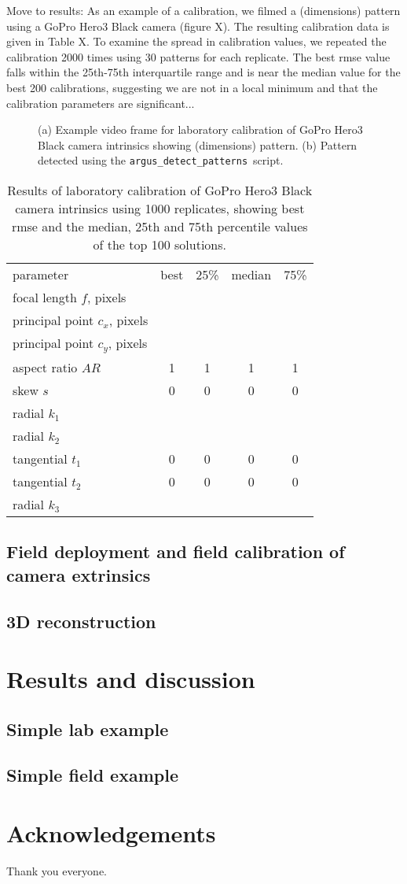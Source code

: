 \documentclass[fleqn,10pt]{wlpeerj}
\newcommand{\detectpatterns}{\texttt{argus\_detect\_patterns}}
\begin{document}
Move to results: As an example of a calibration, we filmed a (dimensions) pattern using a GoPro Hero3 Black camera (figure X).  The resulting calibration data is given in Table X. To examine the spread in calibration values, we repeated the calibration 2000 times using 30 patterns for each replicate. The best rmse value falls within the 25th-75th interquartile range and is near the median value for the best 200 calibrations, suggesting we are not in a local minimum and that the calibration parameters are significant...   

\begin{figure}
\caption{(a) Example video frame for laboratory calibration of GoPro Hero3 Black camera intrinsics showing (dimensions) pattern.  (b) Pattern detected using the \detectpatterns\ script.}
\label{fig:labcal1}
\end{figure}

\begin{table}
\caption{Results of laboratory calibration of GoPro Hero3 Black camera intrinsics using 1000 replicates, showing best rmse and the median, 25th and 75th percentile values of the top 100 solutions. }
\label{tab:labcal2}
\begin{center}
\begin{tabular}{lcccc}
parameter & best & 25\% & median & 75\% \\
\cline{1-5}
focal length $f$, pixels & & & &\\
principal point $c_x$, pixels & & & & \\
principal point $c_y$, pixels & & & & \\
aspect ratio $AR$ & 1 & 1 & 1 & 1\\
skew $s$ & 0 & 0 & 0 & 0 \\
radial $k_1$ & & & & \\
radial $k_2$ & & & & \\
tangential $t_1$ & 0 & 0 & 0 & 0 \\
tangential $t_2$ & 0 & 0 & 0 & 0 \\
radial $k_3$ & & & & \\
\end{tabular}
\end{center}
\end{table}


\subsection*{Field deployment and field calibration of camera extrinsics}
\subsection*{3D reconstruction}

\section*{Results and discussion}
\subsection*{Simple lab example}
\subsection*{Simple field example}

\section*{Acknowledgements}
Thank you everyone.


\end{document}
